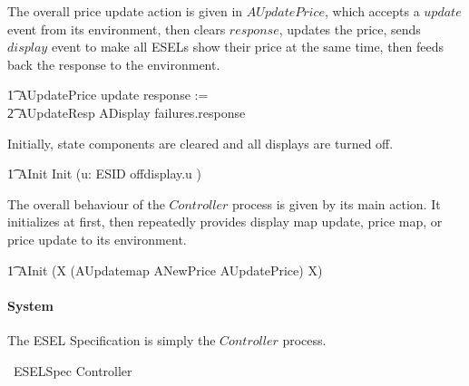 \begin{circusaction}
\end{circusaction}

The overall price update action is given in $AUpdatePrice$, which accepts a $update$ event from its environment, then clears $response$, updates the price, sends $display$ event to make all ESELs show their price at the same time, then feeds back the response to the environment.
\begin{circusaction}
        \t1 AUpdatePrice \circdef update \then response := \emptyset \circseq \\
            \t2 AUpdateResp \circseq ADisplay \circseq failures.response \then \Skip \\ 
\end{circusaction}

Initially, state components are cleared and all displays are turned off.
\begin{circusaction}
    \t1 AInit \circdef \lschexpract Init \rschexpract \circseq (\Interleave u: ESID \linter \emptyset \rinter \circspot offdisplay.u \then \Skip) \\
\end{circusaction}

The overall behaviour of the $Controller$ process is given by its main action. It initializes at first, then repeatedly provides display map update, price map, or price update to its environment.
\begin{circusaction}
	\t1 \circspot AInit \circseq (\circmu X \circspot (AUpdatemap \extchoice ANewPrice \extchoice AUpdatePrice) \circseq X) \\
\end{circusaction}

\begin{circus}
	\circend
\end{circus}

\paragraph{System}
The ESEL Specification is simply the $Controller$ process.
\begin{circus}
    \circprocess\ ESELSpec \circdef  Controller 
\end{circus}
